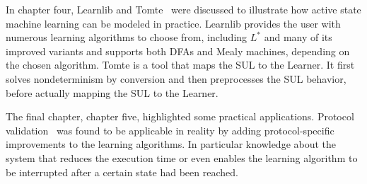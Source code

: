 \documentclass[multi,crop=false,class=article]{standalone}
\begin{document}
In chapter four, Learnlib and Tomte~\cite{Raffelt2009,Tomte2014}
were discussed to illustrate how active state machine learning can be modeled in
practice. Learnlib provides the user with numerous learning algorithms to choose
from, including $L^*$ and many of its improved variants and supports both DFAs
and Mealy machines, depending on the chosen algorithm. Tomte is a tool that maps
the SUL to the Learner. It first solves nondeterminism by conversion and then
preprocesses the SUL behavior, before actually mapping the SUL to the Learner.


The final chapter, chapter
five, highlighted some practical applications.
Protocol validation~\cite{deRuiter2015} was found to be applicable in reality by
adding protocol-specific improvements to the learning algorithms. In particular
knowledge about the system that reduces the execution time or even enables the
learning algorithm to be interrupted after a certain state had been reached.
\end{document}
